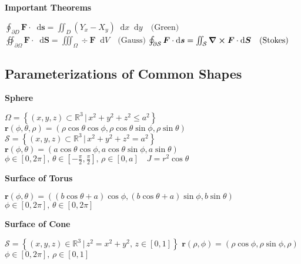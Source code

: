 \documentclass[10pt, a4paper]{article}
\newcommand*\diff{\mathop{}\!\mathrm{d}} %
\newcommand{\R}{\mathbb{R}} %
\begin{document}
\begin{multicols}{2}
\textbf{Important Theorems}	

\vspace{1mm}
$ \oint_{\partial D} \bm{F} \cdot \diff \bm{s} = \iint_D \left(Y_x - X_y\right) \diff x \diff y 	\quad \text{(Green)} $ \vspace{2mm} \newline 
$ \oiint_{\partial \Omega } \bm{F} \cdot \diff \bm{S} = \iiint_{\Omega}\div{\bm{F}}\diff V \quad \text{(Gauss)} $ \vspace{2mm} \newline
$  \oint_{\partial \mathcal{S}}\bm{F} \cdot \diff \bm{s} = \iint_{\mathcal{S}} \curl{\bm{F}} \cdot \diff \bm{S} \quad \text{(Stokes)} $ 

\vspace{-3mm}
\subsection*{Parameterizations of Common Shapes} \vspace{-1mm}

\textbf{Sphere} 

$ \Omega = \left\{ (x, y, z) \subset \R^3 \, \big | \, x^2 + y^2 + z^2 \leq a^2 \right\} $ \newline
$ \bm{r}(\phi, \theta, \rho) = (\rho \cos \theta \cos \phi, \rho \cos \theta \sin \phi, \rho \sin \theta ) $\newline 
$ \mathcal{S} = \left\{ (x, y, z) \subset \R^3 \, \big | \, x^2 + y^2 + z^2 = a^2 \right\} $ \newline
$ \bm{r}(\phi, \theta) = (a \cos \theta \cos \phi, a \cos \theta \sin \phi, a \sin \theta ) $\newline
$ \phi \in [0, 2\pi], \, \theta \in \left [-\frac{\pi}{2}, \frac{\pi}{2} \right ], \, \rho \in [0, a] \quad J = r^2 \cos \theta $

\vspace{2mm}

\textbf{Surface of Torus}

$ \bm{r}(\phi, \theta) = ((b \cos \theta + a) \cos \phi, (b \cos \theta + a) \sin \phi, b \sin \theta) $ \newline
$ \phi \in [0, 2\pi], \, \theta \in [0, 2 \pi] $ 

\vspace{2mm}

\textbf{Surface of Cone}

$ \mathcal{S} = \left\{ (x, y, z) \in \R^3 \, | \, z^2 = x^2 + y^2, \, z\in [0, 1] \right\} $  \newline
$ \bm{r}(\rho, \phi) = (\rho \cos \phi, \rho \sin \phi, \rho) $\newline
$ \phi \in [0, 2\pi], \, \rho \in [0, 1]  $


\end{multicols}
\end{document}

